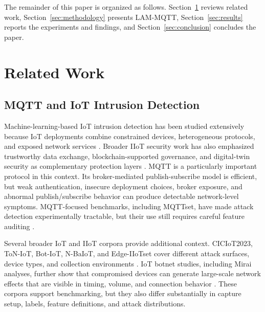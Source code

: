 \documentclass[lettersize,journal]{IEEEtran}
\begin{document}
The remainder of this paper is organized as follows. Section~\ref{sec:related} reviews related work, Section~\ref{sec:methodology} presents LAM-MQTT, Section~\ref{sec:results} reports the experiments and findings, and Section~\ref{sec:conclusion} concludes the paper.

\section{Related Work}
\label{sec:related}
\subsection{MQTT and IoT Intrusion Detection}
Machine-learning-based IoT intrusion detection has been studied extensively because IoT deployments combine constrained devices, heterogeneous protocols, and exposed network services \cite{algaradi2020survey,hussain2020machine,hodo2017taxonomy}. Broader IIoT security work has also emphasized trustworthy data exchange, blockchain-supported governance, and digital-twin security as complementary protection layers \cite{li2025blockchaindt}. MQTT is a particularly important protocol in this context. Its broker-mediated publish-subscribe model is efficient, but weak authentication, insecure deployment choices, broker exposure, and abnormal publish/subscribe behavior can produce detectable network-level symptoms. MQTT-focused benchmarks, including MQTTset, have made attack detection experimentally tractable, but their use still requires careful feature auditing \cite{vaccari2020mqttset}.

Several broader IoT and IIoT corpora provide additional context. CICIoT2023, ToN-IoT, Bot-IoT, N-BaIoT, and Edge-IIoTset cover different attack surfaces, device types, and collection environments \cite{ciciot2023,alsaedi2020toniot,koroniotis2019botiot,meidan2018nbaiot,ferrag2022edgeiiotset}. IoT botnet studies, including Mirai analyses, further show that compromised devices can generate large-scale network effects that are visible in timing, volume, and connection behavior \cite{antonakakis2017mirai,kolias2017mirai}. These corpora support benchmarking, but they also differ substantially in capture setup, labels, feature definitions, and attack distributions.
\end{document}
